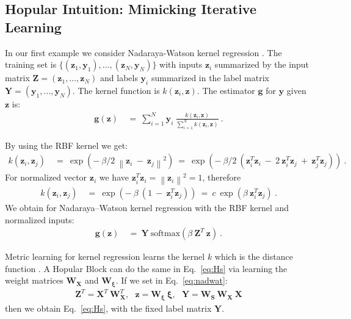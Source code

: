 \documentclass{article}
\theoremstyle{plain}
\theoremstyle{definition}
\theoremstyle{remark}
\newcommand\Bg{\bm{g}}
\newcommand\By{\bm{y}}
\newcommand\Bz{\bm{z}}
\newcommand\BS{\bm{S}}
\newcommand\BW{\bm{W}}
\newcommand\BX{\bm{X}}
\newcommand\BY{\bm{Y}}
\newcommand\BZ{\bm{Z}}
\newcommand\Bxi{\bm{\xi}}
\newcommand{\NRM}[1]{{{\left\| #1\right\|}}}
\newcommand{\soft}{\mathrm{softmax}}
\begin{document}
\subsection{Hopular Intuition: Mimicking Iterative Learning}\label{sec:iter_learn}
In our first example we consider Nadaraya-Watson kernel regression
\citep{Watson:64,Nadaraya:64,Benedetti:77,Weinberger:07}.
The training set is
$\{(\Bz_1,\By_1),\ldots,(\Bz_N,\By_N)\}$ 
with inputs $\Bz_i$ summarized by the input
matrix $\BZ = (\Bz_1,\ldots,\Bz_N)$ and labels $\By_i$ summarized
in the label matrix $\BY=(\By_1,\ldots,\By_N)$. The kernel function 
is $k(\Bz_i,\Bz)$.
The estimator $\Bg$ for $\By$ given $\Bz$ is:
\begin{align}
    \Bg(\Bz) \ &= \  \sum_{i=1}^N \By_i \ \frac{k(\Bz_i,\Bz)}{\sum_{i=1}^N  k(\Bz_i,\Bz)} \ .
\end{align}

By using the RBF kernel we get:
\begin{align}
k(\Bz_i,\Bz_j) \ &= \  \exp(- \ \beta/2  \ \NRM{\Bz_i \ - \ \Bz_j}^2 ) \ =
 \  \exp(- \ \beta/2  \ ( \Bz_i^T \Bz_i \ - \ 2 \ \Bz_i^T \Bz_j \ + \
                   \Bz_j^T \Bz_j ) )\ .
\end{align}
For normalized vector $\Bz_i$ we have $ \Bz_i^T \Bz_i = \NRM{\Bz_i}^2
=1$, therefore
\begin{align}
  k(\Bz_i,\Bz_j) \ &= \   \exp(- \ \beta  \ ( 1 \ - \ \Bz_i^T \Bz_j) )
   \ = \ c \  \exp( \beta  \ \Bz_i^T \Bz_j )\ .
\end{align}
We obtain for Nadaraya–Watson kernel regression  with the RBF kernel and normalized inputs:
\begin{align} \label{eq:nadwat}
\Bg(\Bz) \ &= \   \BY \ \soft(\beta \ \BZ^T \ \Bz)  \ .
\end{align}

Metric learning for kernel regression learns the kernel $k$
which is the distance function \citep{Weinberger:07}. A Hopular Block can
do the same in Eq.~\ref{eq:Hs} via learning the weight matrices $\BW_{\BX}$
and $\BW_{\Bxi}$. If we set in Eq.~\ref{eq:nadwat}:
\begin{align}
    \BZ^T = \BX^T \ \BW_{\BX}^T, \ \ \ \Bz = \BW_{\Bxi} \ \Bxi, \ \ \ \BY = \BW_{\BS} \ \BW_{\BX} \ \BX
\end{align}
then we obtain Eq.~\ref{eq:Hs}, with the fixed label matrix $\BY$. \\
\end{document}
